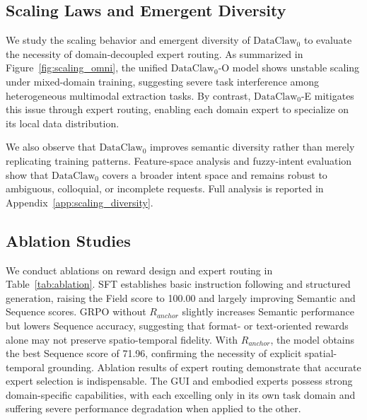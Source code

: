 \subsection{Scaling Laws and Emergent Diversity }
\label{subsec:scaling_and_diversity}

We study the scaling behavior and emergent diversity of $\text{DataClaw}_0$ to evaluate the necessity of domain-decoupled expert routing. As summarized in Figure~\ref{fig:scaling_omni}, the unified $\text{DataClaw}_0$-O model shows unstable scaling under mixed-domain training, suggesting severe task interference among heterogeneous multimodal extraction tasks. By contrast, $\text{DataClaw}_0$-E mitigates this issue through expert routing, enabling each domain expert to specialize on its local data distribution.

We also observe that $\text{DataClaw}_0$ improves semantic diversity rather than merely replicating training patterns. Feature-space analysis and fuzzy-intent evaluation show that $\text{DataClaw}_0$ covers a broader intent space and remains robust to ambiguous, colloquial, or incomplete requests. Full analysis is reported in Appendix~\ref{app:scaling_diversity}.



\subsection{Ablation Studies}
\label{sec:ablation}

We conduct ablations on reward design and expert routing in Table~\ref{tab:ablation}.
SFT establishes basic instruction following and structured generation, raising the Field score to 100.00 and largely improving Semantic and Sequence scores. GRPO without \(R_{anchor}\) slightly increases Semantic performance but lowers Sequence accuracy, suggesting that format- or text-oriented rewards alone may not preserve spatio-temporal fidelity. With \(R_{anchor}\), the model obtains the best Sequence score of 71.96, confirming the necessity of explicit spatial-temporal grounding.
Ablation results of expert routing demonstrate that accurate expert selection is indispensable. The GUI and embodied experts possess strong domain-specific capabilities, with each excelling only in its own task domain and suffering severe performance degradation when applied to the other.

